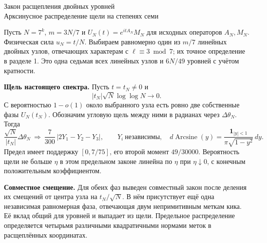 \documentclass[11pt,a4paper]{article}
\newcommand{\subt}[1]{\par\medskip\noindent\textbf{#1.}\quad}
\newcommand{\as}{\operatorname{Arcsine}}
\begin{document}
\begin{center}{\LARGE\sffamily Закон расщепления двойных уровней}\\[4pt]
{\large Арксинусное распределение щели на степенях семи}
\end{center}
Пусть \(N=7^k\), \(m=3N/7\) и \(U_N(t)=e^{itA_N}M_N\) для исходных операторов \(A_N,M_N\). Физическая сила \(u_N=t/N\). Выбираем равномерно один из \(m/7\) линейных двойных узлов, отвечающих характерам с \(\ell\equiv3\bmod7\); их точное определение в разделе 1. Это одна седьмая всех линейных узлов и \(6N/49\) уровней с учётом кратности.

\subt{Щель настоящего спектра}
Пусть \(t=t_N\ne0\) и
\[
                       |t_N|\sqrt N\log\log N\longrightarrow0.
\]
С вероятностью \(1-o(1)\) около выбранного узла есть ровно две собственные фазы \(U_N(t_N)\). Обозначим угловую щель между ними в радианах через \(\Delta\theta_N\). Тогда
\[
       \frac{\sqrt N}{|t_N|}\Delta\theta_N
                  \ \Longrightarrow\ \frac7{300}\,|2Y_1-Y_2-Y_3|,
              \qquad Y_i\ \text{независимы},\quad
              d\as(y)=\frac{\mathbf1_{|y|<1}}{\pi\sqrt{1-y^2}}\,dy .
\]
Предел имеет поддержку \([0,7/75]\), его второй момент \(49/30000\).
Вероятность щели не больше \(\eta\) в этом предельном законе линейна по \(\eta\) при \(\eta\downarrow0\), с конечным положительным коэффициентом.

\subt{Совместное смещение}
Для обеих фаз выведен совместный закон после деления их смещений от центра узла на \(t_N/\sqrt N\). В нём присутствует ещё одна независимая равномерная фаза, отвечающая двум непримитивным меткам кика. Её вклад общий для уровней и выпадает из щели. Предельное распределение определяется четырьмя различными квадратичными нормами меток в расщеплённых координатах.
\end{document}
